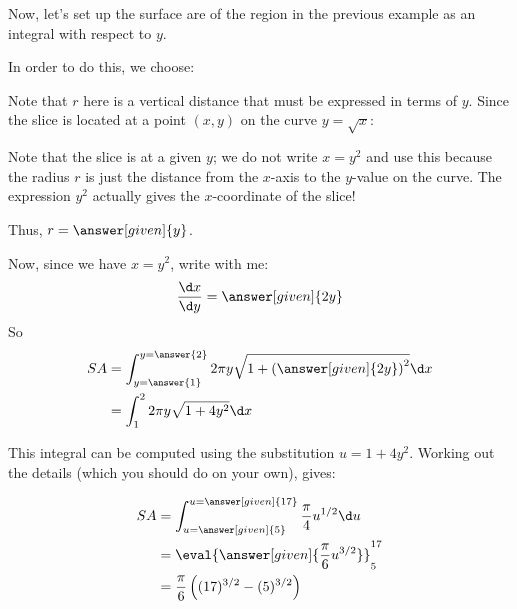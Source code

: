 \documentclass{ximera}
\begin{document}
\begin{example} Now, let's set up the surface are of the region in the previous example as an integral with respect to $y$. 

\begin{explanation}
 In order to do this, we choose:
    
    \begin{multipleChoice}
    \end{multipleChoice}
    
    Note that $r$ here is a vertical distance that must be expressed in terms of $y$.  Since the slice is located at a point $(x,y)$ on the curve $y=\sqrt{x}$:
    
    \begin{multipleChoice}
    \end{multipleChoice}
    
\begin{feedback}
Note that the slice is at a given $y$; we do not write $x=y^2$ and use this because the radius $r$ is just the distance from the $x$-axis to the $y$-value on the curve.  The expression $y^2$ actually gives the $x$-coordinate of the slice! 
\end{feedback}

    \begin{multipleChoice}
    \end{multipleChoice}

Thus, $r= \answer[given]{y}$.
     
Now, since we have $x=y^2$, write with me:
    \[
    \frac{\d x}{\d y} = \answer[given]{2y}
    \]
    So
    \begin{align*}
      SA &= \int_{y=\answer{1}}^{y=\answer{2}} 2\pi y \sqrt{1 + \left(\answer[given]{2y}\right)^2} \d x\\
      &= \int_1^2 2\pi y \sqrt{1 +4y^2} \d x\\
      \end{align*}
      
      This integral can be computed using the substitution $u=1+4y^2$.  Working out the details (which you should do on your own), gives:
      
      \begin{align*}
     SA &= \int_{u=\answer[given]{5}}^{u=\answer[given]{17}} \frac{\pi}{4} u^{1/2} \d u \\ 
     &= \eval{\answer[given]{\frac{\pi}{6} u^{3/2}}}_5^{17}\\
     &= \frac{\pi}{6} \left((17)^{3/2}-(5)^{3/2}  \right)
    \end{align*}
  \end{explanation}
  \end{example}
  
\end{document}
